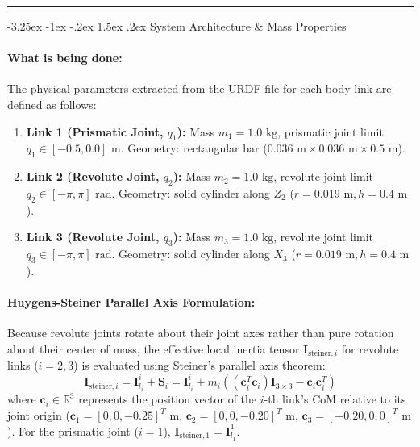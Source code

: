 \documentclass[11pt, a4paper]{article}
\makeatletter
\renewcommand{\subsection}{\@startsection{subsection}{2}{\z@}%
    {-3.25ex \@plus -1ex \@minus -.2ex}%
    {1.5ex \@plus .2ex}%
    {\normalfont\large\bfseries\color{brandaccent}}}
\makeatother
\begin{document}
\hrule
\vspace{1.5em}

\subsection{System Architecture \& Mass Properties}
\paragraph{What is being done:}
The physical parameters extracted from the URDF file for each body link are defined as follows:
\begin{enumerate}[leftmargin=1.5em]
    \item \textbf{Link 1 (Prismatic Joint, $q_1$):} Mass $m_1 = 1.0\text{ kg}$, prismatic joint limit $q_1 \in [-0.5, 0.0]\text{ m}$. Geometry: rectangular bar ($0.036\text{ m} \times 0.036\text{ m} \times 0.5\text{ m}$).
    \item \textbf{Link 2 (Revolute Joint, $q_2$):} Mass $m_2 = 1.0\text{ kg}$, revolute joint limit $q_2 \in [-\pi, \pi]\text{ rad}$. Geometry: solid cylinder along $Z_2$ ($r = 0.019\text{ m}, h = 0.4\text{ m}$).
    \item \textbf{Link 3 (Revolute Joint, $q_3$):} Mass $m_3 = 1.0\text{ kg}$, revolute joint limit $q_3 \in [-\pi, \pi]\text{ rad}$. Geometry: solid cylinder along $X_3$ ($r = 0.019\text{ m}, h = 0.4\text{ m}$).
\end{enumerate}

\paragraph{Huygens-Steiner Parallel Axis Formulation:}
Because revolute joints rotate about their joint axes rather than pure rotation about their center of mass, the effective local inertia tensor $\mathbf{I}_{\text{steiner}, i}$ for revolute links ($i=2,3$) is evaluated using Steiner's parallel axis theorem:
\begin{equation}
    \mathbf{I}_{\text{steiner}, i} = \mathbf{I}_{l_i}^i + \mathbf{S}_i = \mathbf{I}_{l_i}^i + m_i \left( (\mathbf{c}_i^T \mathbf{c}_i) \mathbf{I}_{3\times3} - \mathbf{c}_i \mathbf{c}_i^T \right)
\end{equation}
where $\mathbf{c}_i \in \mathbb{R}^3$ represents the position vector of the $i$-th link's CoM relative to its joint origin ($\mathbf{c}_1 = [0, 0, -0.25]^T\text{ m}$, $\mathbf{c}_2 = [0, 0, -0.20]^T\text{ m}$, $\mathbf{c}_3 = [-0.20, 0, 0]^T\text{ m}$). For the prismatic joint ($i=1$), $\mathbf{I}_{\text{steiner}, 1} = \mathbf{I}_{l_1}^1$.
\end{document}
